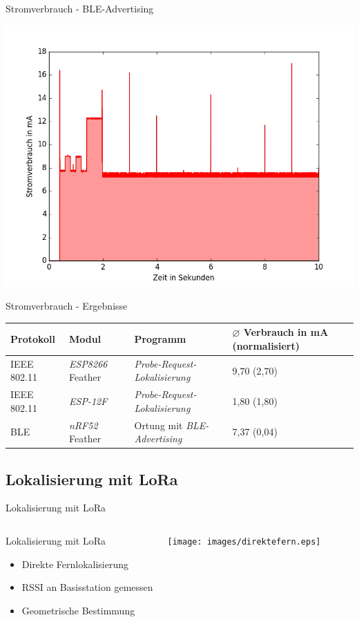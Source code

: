 \documentclass[18pt]{beamer}
\begin{document}
\begin{frame}{Stromverbrauch - BLE-Advertising}
	\begin{minipage}[c][\textheight][t]{\textwidth}
		\centering
		\includegraphics[height=0.85\textheight]{plots/blue.png}
	\end{minipage}
\end{frame}

\begin{frame}{Stromverbrauch - Ergebnisse}
	\begin{tabular}{l|l|p{3.1cm}|R{2.1cm}}
		Protokoll & Modul & Programm  & $\varnothing$ Verbrauch in mA (normalisiert)\\
		\hline
		IEEE 802.11 & \emph{ESP8266} Feather & \emph{Probe-Request-Lokalisierung} & 9,70 (2,70)\\
		IEEE 802.11 & \emph{ESP-12F} & \emph{Probe-Request-Lokalisierung} & 1,80 (1,80)\\
		\hline
		BLE & \emph{nRF52} Feather & Ortung mit \emph{BLE-Advertising} & 7,37 (0,04)\\
	\end{tabular}
\end{frame}

\subsection{Lokalisierung mit LoRa}
\begin{frame}{Lokalisierung mit LoRa}
	\begin{columns}
			\begin{block}{Lokalisierung mit LoRa}
				\begin{itemize}
					\item Direkte Fernlokalisierung
					\item RSSI an Basisstation gemessen
					\item Geometrische Bestimmung
				\end{itemize}
			\end{block}
			\centering
			\texttt{[image: images/direktefern.eps]}
	\end{columns}
\end{frame}
\end{document}
